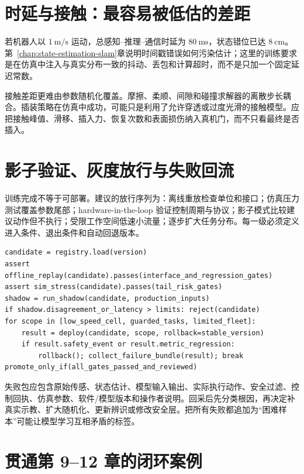 \section{时延与接触：最容易被低估的差距}

若机器人以 $1\ \mathrm{m/s}$ 运动，总感知--推理--通信时延为 $80\ \mathrm{ms}$，状态错位已达 $8\ \mathrm{cm}$。第~\ref{chap:state-estimation-slam}章说明时间戳错误如何污染估计；这里的训练要求是在仿真中注入与真实分布一致的抖动、丢包和计算超时，而不是只加一个固定延迟常数。

接触差距更难由参数随机化覆盖。摩擦、柔顺、间隙和碰撞求解器的离散步长耦合。插装策略在仿真中成功，可能只是利用了允许穿透或过度光滑的接触模型。应把接触峰值、滑移、插入力、恢复次数和表面损伤纳入真机门，而不只看最终是否插入。

\section{影子验证、灰度放行与失败回流}

训练完成不等于可部署。建议的放行序列为：离线重放检查单位和接口；仿真压力测试覆盖参数尾部；hardware-in-the-loop 验证控制周期与协议；影子模式比较建议动作但不执行；受限工作空间低速小流量；逐步扩大任务分布。每一级必须定义进入条件、退出条件和自动回退版本。

\begin{lstlisting}[caption={模型版本放行与失败回采的教学伪代码}]
candidate = registry.load(version)
assert offline_replay(candidate).passes(interface_and_regression_gates)
assert sim_stress(candidate).passes(tail_risk_gates)
shadow = run_shadow(candidate, production_inputs)
if shadow.disagreement_or_latency > limits: reject(candidate)
for scope in [low_speed_cell, guarded_tasks, limited_fleet]:
    result = deploy(candidate, scope, rollback=stable_version)
    if result.safety_event or result.metric_regression:
        rollback(); collect_failure_bundle(result); break
promote_only_if(all_gates_passed_and_reviewed)
\end{lstlisting}

失败包应包含原始传感、状态估计、模型输入输出、实际执行动作、安全过滤、控制回执、仿真参数、软件/模型版本和操作者说明。回采后先分类根因，再决定补真实示教、扩大随机化、更新辨识或修改安全层。把所有失败都追加为“困难样本”可能让模型学习互相矛盾的标签。

\section{贯通第 9--12 章的闭环案例}

